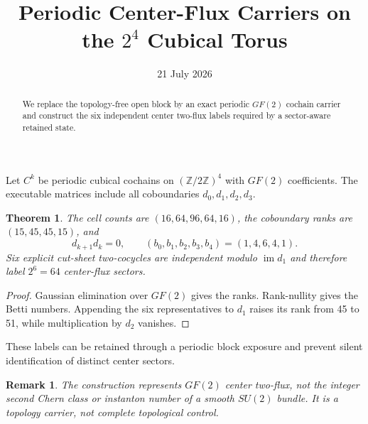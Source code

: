 \documentclass[11pt]{article}\usepackage[margin=1in]{geometry}\usepackage{amsmath,amssymb,amsthm}\newtheorem{theorem}{Theorem}\newtheorem{remark}{Remark}
\title{Periodic Center-Flux Carriers on the $2^4$ Cubical Torus}\author{}\date{21 July 2026}
\begin{document}
\maketitle
\begin{abstract}We replace the topology-free open block by an exact periodic $GF(2)$ cochain carrier and construct the six independent center two-flux labels required by a sector-aware retained state.\end{abstract}
Let $C^k$ be periodic cubical cochains on $(\mathbb Z/2\mathbb Z)^4$ with $GF(2)$ coefficients. The executable matrices include all coboundaries $d_0,d_1,d_2,d_3$.
\begin{theorem}The cell counts are $(16,64,96,64,16)$, the coboundary ranks are $(15,45,45,15)$, and
\[d_{k+1}d_k=0,\qquad (b_0,b_1,b_2,b_3,b_4)=(1,4,6,4,1).
\]
Six explicit cut-sheet two-cocycles are independent modulo $\operatorname{im}d_1$ and therefore label $2^6=64$ center-flux sectors.\end{theorem}
\begin{proof}Gaussian elimination over $GF(2)$ gives the ranks. Rank-nullity gives the Betti numbers. Appending the six representatives to $d_1$ raises its rank from 45 to 51, while multiplication by $d_2$ vanishes.\end{proof}
These labels can be retained through a periodic block exposure and prevent silent identification of distinct center sectors.
\begin{remark}The construction represents $GF(2)$ center two-flux, not the integer second Chern class or instanton number of a smooth $SU(2)$ bundle. It is a topology carrier, not complete topological control.\end{remark}
\end{document}
